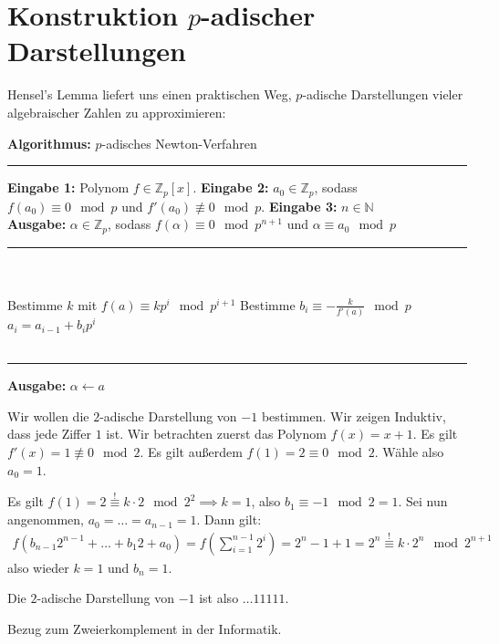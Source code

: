 \documentclass{report}
\newcommand*{\newpar}{\par\vspace{\baselineskip}\noindent}
\newcommand{\tbf}[1]{\textbf{#1}}
\newcommand{\bN}{\mathbb{N}}
\newcommand{\bZ}{\mathbb{Z}}
\begin{document}
	\section{Konstruktion $p$-adischer Darstellungen}
	Hensel's Lemma liefert uns einen praktischen Weg, $p$-adische Darstellungen vieler algebraischer Zahlen zu approximieren:
	\begin{algorithm}
		\tbf{Algorithmus:} $p$-adisches Newton-Verfahren
		\hrule\phantom{}
		\begin{algorithmic}
			\State \tbf{Eingabe 1:} Polynom $f \in \bZ_p[x]$. 
			\State \tbf{Eingabe 2:} $a_0 \in \bZ_p$, sodass $f(a_0) \equiv 0 \mod p$ und $f'(a_0) \not\equiv 0 \mod p$.
			\State \tbf{Eingabe 3:} $n \in \bN$
			\\
			\State \tbf{Ausgabe:} $\alpha \in \bZ_p$, sodass $f(\alpha) \equiv 0 \mod p^{n+1}$ und $\alpha \equiv a_0 \mod p$\\
			\phantom{}
			\hrule
			\\\\
				\State Bestimme $k$ mit $f(a) \equiv kp^i \mod p^{i+1}$
				\State Bestimme $\displaystyle b_i \equiv - \frac{k}{f'(a)} \mod p$ 
				\State $\displaystyle a_i = a_{i-1} + b_ip^i$
			\EndFor
			\\\\
			\hrule
			\State \tbf{Ausgabe:} $\alpha \gets a$
		\end{algorithmic}
	\end{algorithm}
	\iffalse
	\begin{application}
		Wir wollen die $2$-adische Darstellung von $-1$ bestimmen. Wir zeigen Induktiv, dass jede Ziffer $1$ ist. Wir betrachten zuerst das Polynom $f(x) = x + 1$. Es gilt $f'(x) = 1 \not\equiv 0 \mod 2$. Es gilt außerdem $f(1) = 2 \equiv 0 \mod 2$. Wähle also $a_0 = 1$.
		\newpar
		Es gilt $f(1) = 2 \overset{!}{\equiv} k \cdot 2 \mod 2^2 \implies k = 1$, also $b_1 \equiv -1 \mod 2 = 1$. Sei nun angenommen, $a_0 = \hdots = a_{n-1} = 1$. Dann gilt:
		\begin{align*}
			f(b_{n-1}2^{n-1} + \hdots + b_1 2 + a_0) = f\left(\sum_{i = 1}^{n-1} 2^i\right) = 2^n - 1 + 1 = 2^n \overset{!}{\equiv} k \cdot 2^{n} \mod 2^{n+1}
		\end{align*}
		also wieder $k = 1$ und $b_n = 1$.
		\newpar
		Die $2$-adische Darstellung von $-1$ ist also $\hdots11111$.
	\end{application}
	\begin{application}
		Bezug zum Zweierkomplement in der Informatik.
	\end{application}
\end{document}
